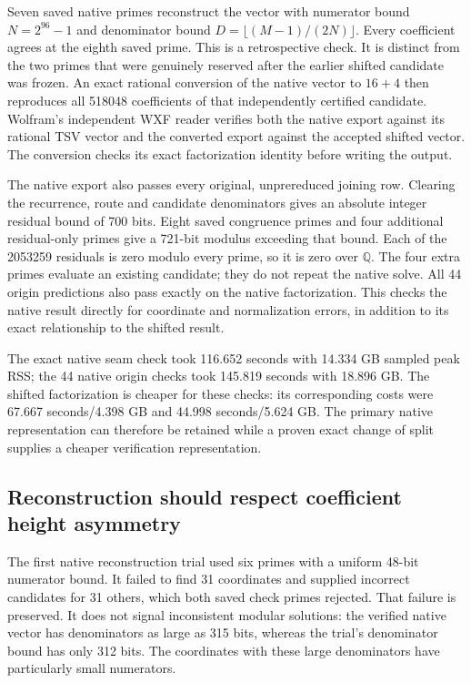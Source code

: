 \documentclass[11pt]{article}
\begin{document}
Seven saved native primes reconstruct the vector with numerator bound
$N=2^{96}-1$ and denominator bound
$D=\lfloor(M-1)/(2N)\rfloor$. Every coefficient agrees at the eighth
saved prime. This is a retrospective check. It is distinct from the two
primes that were genuinely reserved after the earlier shifted candidate
was frozen. An exact rational conversion of the native vector to $16+4$
then reproduces all 518048 coefficients of that independently certified
candidate. Wolfram's independent WXF reader verifies both the native
export against its rational TSV vector and the converted export against
the accepted shifted vector. The conversion checks its exact factorization
identity before writing the output.

The native export also passes every original, unprereduced joining row.
Clearing the recurrence, route and candidate denominators gives an absolute
integer residual bound of 700 bits. Eight saved congruence primes and four
additional residual-only primes give a 721-bit modulus exceeding that
bound. Each of the 2053259 residuals is zero modulo every prime, so it is
zero over $\mathbb Q$. The four extra primes evaluate an existing candidate;
they do not repeat the native solve. All 44 origin predictions also pass
exactly on the native factorization. This checks the native result directly for coordinate and normalization
errors, in addition to its exact relationship to the shifted result.

The exact native seam check took 116.652 seconds with 14.334 GB sampled
peak RSS; the 44 native origin checks took 145.819 seconds with 18.896 GB.
The shifted factorization is cheaper for these checks: its corresponding
costs were 67.667 seconds/4.398 GB and 44.998 seconds/5.624 GB. The primary
native representation can therefore be retained while a proven exact
change of split supplies a cheaper verification representation.

\subsection{Reconstruction should respect coefficient height asymmetry}
The first native reconstruction trial used six primes with a uniform
48-bit numerator bound. It failed to find 31 coordinates and supplied
incorrect candidates for 31 others, which both saved check primes rejected.
That failure is preserved. It does not signal inconsistent modular solutions:
the verified native vector has denominators as large as 315 bits, whereas
the trial's denominator bound has only 312 bits. The coordinates with these
large denominators have particularly small numerators.
\end{document}
